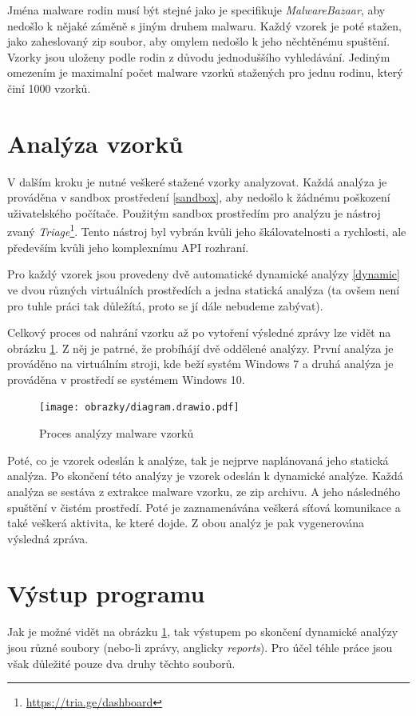 Jména malware rodin musí být stejné jako je specifikuje \textit{MalwareBazaar}, aby nedošlo k nějaké záměně s jiným druhem malwaru. Každý vzorek je poté stažen, jako zaheslovaný zip soubor, aby omylem nedošlo k 
jeho něchtěnému spuštění. Vzorky jsou uloženy podle rodin z důvodu jednoduššího vyhledávání. Jediným omezením je maximalní počet malware vzorků stažených pro jednu rodinu, který činí 1000 vzorků.

\section{Analýza vzorků}
V dalším kroku je nutné veškeré stažené vzorky analyzovat. Každá analýza je prováděna v sandbox prostředení \ref{sandbox}, aby nedošlo k žádnému poškození uživatelského počítače.
Použitým sandbox prostředím pro analýzu je nástroj zvaný \textit{Triage}\footnote{\href{https://tria.ge/dashboard}{https://tria.ge/dashboard}}. Tento nástroj byl vybrán kvůli jeho škálovatelnosti a rychlosti, 
ale především kvůli jeho komplexnímu API rozhraní.

Pro každý vzorek jsou provedeny dvě automatické dynamické analýzy \ref{dynamic} ve dvou různých virtuálních prostředích a jedna statická analýza (ta ovšem není pro tuhle práci tak důležítá, proto se jí dále nebudeme zabývat). 

Celkový proces od nahrání vzorku až po vytoření výsledné zprávy lze vidět na obrázku \ref{Analysis_diagram}. Z něj je patrné, že probíhájí dvě oddělené analýzy. První analýza je prováděno na virtuálním stroji, kde beží 
systém Windows 7 a druhá analýza je prováděna v prostředí se systémem Windows 10.

\begin{figure}[h]
	\centering
        \texttt{[image: obrazky/diagram.drawio.pdf]}
	\caption{Proces analýzy malware vzorků}
    \label{Analysis_diagram}
\end{figure}

Poté, co je vzorek odeslán k analýze, tak je nejprve naplánovaná jeho statická analýza. Po skončení této analýzy je vzorek odeslán k dynamické analýze. Každá analýza se sestáva z extrakce malware vzorku, ze zip archivu. A jeho následného spuštění v čistém prostředí. Poté je zaznamenávána veškerá síťová komunikace a také veškerá aktivita, ke které dojde.
Z obou analýz je pak vygenerována výsledná zpráva.
\section{Výstup programu}
Jak je možné vidět na obrázku \ref{Analysis_diagram}, tak výstupem po skončení dynamické analýzy jsou různé soubory (nebo-li zprávy, anglicky \textit{reports}). Pro účel téhle práce jsou však důležité pouze dva druhy těchto souborů.

